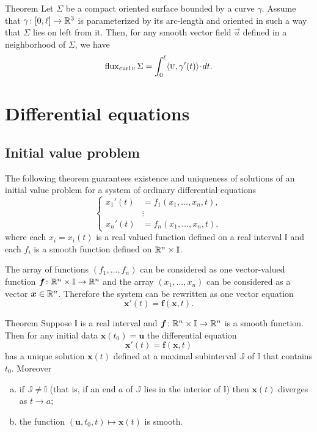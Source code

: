 \begin{thm}{Theorem}\label{thm:curl}
Let $\Sigma$ be a compact oriented surface bounded by a curve $\gamma$.
Assume that $\gamma\colon[0,\ell]\to \mathbb{R}^3$ is parameterized by its arc-length and oriented in such a way that $\Sigma$ lies on left from it.
Then, for any smooth vector field $\vec u$ defined in a neighborhood of $\Sigma$, we have
\[\flux_{\curl\vec u}\Sigma=\int_0^\ell\langle\vec u,\gamma'(t)\rangle\cdot dt.\]

\end{thm}



\chapter{Differential equations}

\section*{Initial value problem}

The following theorem guarantees existence and uniqueness of solutions of an initial value problem
for a system of ordinary differential equations
\[
\begin{cases}
x_1'(t)&=f_1(x_1,\dots,x_n,t),
\\
&\vdots
\\
x_n'(t)&=f_n(x_1,\dots,x_n,t),
\end{cases}
\]
where each $x_i=x_i(t)$ is a real valued function defined on a real interval $\mathbb{I}$
and each $f_i$ is a smooth function defined on $\mathbb{R}^n\times \mathbb{I}$.

The array of functions $(f_1,\dots,f_n)$ can be considered as one vector-valued function 
$\bm{f}\colon\mathbb{R}^n\times \mathbb{I}\to \mathbb{R}^n$ and the array $(x_1,\dots,x_n)$ can be considered as a vector  $\bm{x}\in\mathbb{R}^n$.
Therefore the system can be rewritten as one vector equation 
\[\bm{x}'(t)=\bm{f}(\bm{x}, t).\] 

\begin{thm}{Theorem}\label{thm:ODE}
Suppose $\mathbb{I}$ is a real interval and $\bm{f}\colon\mathbb{R}^n\times\mathbb{I}\to \mathbb{R}^n$ is a smooth function.
Then for any initial data $\bm{x}(t_0)=\bm{u}$ the differential equation 
\[\bm{x}'(t)=\bm{f}(\bm{x},t)\]
has a unique solution $\bm{x}(t)$ defined at a maximal subinterval $\mathbb{J}$ of $\mathbb{I}$ that contains $t_0$.
Moreover
\begin{enumerate}[(a)]
\item  if $\mathbb{J}\ne \mathbb{I}$ (that is, if an end $a$ of $\mathbb{J}$ lies in the interior of $\mathbb{I}$) then $\bm{x}(t)$ diverges as $t\to a$;
\item  the function $(\bm{u},t_0,t)\mapsto \bm{x}(t)$ is smooth.
\end{enumerate}


\end{thm}

